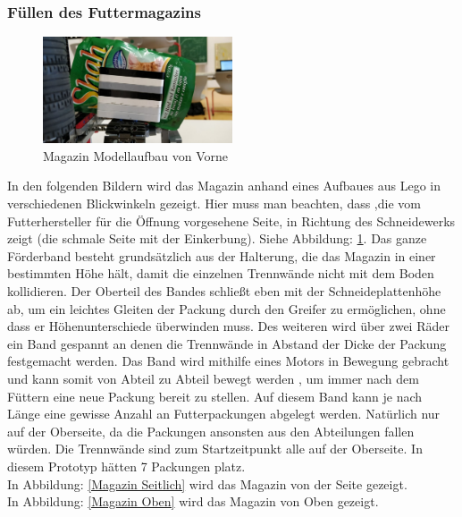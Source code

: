 \newpage
\subsubsection{Füllen des Futtermagazins}


\begin{figure}
\vspace{-30pt}
  \begin{center}
    \includegraphics[width=0.50\textwidth]{Bilder/Ablauf_1_png/Magazin_Vorne}
  \end{center}
  \caption{Magazin Modellaufbau von Vorne}
  \label{Magazin Vorne}
  \vspace{-10pt}
\end{figure}

In den folgenden Bildern wird das Magazin anhand eines Aufbaues aus Lego in verschiedenen Blickwinkeln gezeigt. Hier muss man beachten, dass ,die vom Futterhersteller für die Öffnung vorgesehene Seite, in Richtung des Schneidewerks zeigt (die schmale Seite mit der Einkerbung). Siehe Abbildung: \ref{Magazin Vorne}.
Das ganze Förderband besteht grundsätzlich aus der Halterung, die das Magazin in einer bestimmten Höhe hält, damit die einzelnen Trennwände nicht mit dem Boden kollidieren. Der Oberteil des Bandes schließt eben mit der Schneideplattenhöhe ab, um ein leichtes Gleiten der Packung durch den Greifer zu ermöglichen, ohne dass er Höhenunterschiede überwinden muss. Des weiteren wird über zwei Räder ein Band gespannt an denen die Trennwände in Abstand der Dicke der Packung festgemacht werden. Das Band wird mithilfe eines Motors in Bewegung gebracht und kann somit von Abteil zu Abteil bewegt werden , um immer nach dem Füttern eine neue Packung bereit zu stellen. Auf diesem Band kann je nach Länge eine gewisse Anzahl an Futterpackungen abgelegt werden. Natürlich nur auf der Oberseite, da die Packungen ansonsten aus den Abteilungen fallen würden. Die Trennwände sind zum Startzeitpunkt alle auf der Oberseite. In diesem Prototyp hätten 7 Packungen platz.\\

In Abbildung: \ref{Magazin Seitlich} wird das Magazin von der Seite gezeigt. \\
In Abbildung: \ref{Magazin Oben} wird das Magazin von Oben gezeigt. 

